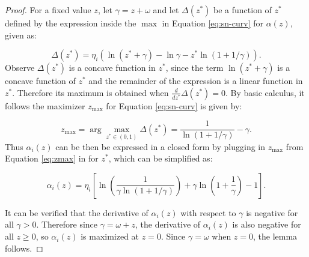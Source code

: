 \begin{proof} 

For a fixed value $z$, let $\gamma = z + \omega$ and let $\Delta(z^*)$ be a function of $z^*$ defined by the expression inside the $\max$ in Equation \eqref{eq:sn-curv} for $\alpha(z)$, given as:


\begin{equation*}
\Delta(z^*) = \eta_i\left(\ln(z^* + \gamma) - \ln \gamma - z^*\ln(1+1/\gamma)\right).
\end{equation*}
Observe $\Delta(z^*)$ is a concave function in $z^*$, since the term $\ln(z^* + \gamma)$ is a concave function of $z^*$
and the remainder of the expression is a linear function in $z^*$. 
Therefore its maximum is obtained when $\frac{d}{dz^*} \Delta(z^*) = 0.$ 
By basic calculus, it follows the maximizer $z_{\max}$ for Equation \eqref{eq:sn-curv}
is given by:

\begin{equation} 
\label{eq:zmax}
z_{\max} = \arg\max_{z^* \in (0, 1)} \Delta(z^*)  =  \frac{1}{\ln\left(1 + 1/\gamma \right)} - \gamma.
\end{equation}
Thus $\alpha_i(z)$ can be then be expressed in a
closed form by plugging in $z_{\max}$ from Equation \eqref{eq:zmax}
in for $z^*$, which can be simplified as:

\begin{equation*} 
\alpha_i(z) = \eta_i\left[\ln\left(\frac{1}{\gamma \ln(1+1/\gamma)}\right) + \gamma \ln\left(1+\frac{1}{\gamma}\right) - 1\right].
\end{equation*}

It can be verified that the derivative of $\alpha_i(z)$ with respect to $\gamma$ is negative for all $\gamma > 0$. Therefore since $\gamma = \omega + z$, 
the derivative of $\alpha_i(z)$ is also negative for all $z \geq 0$, so $\alpha_i(z)$ is maximized at $z = 0$. Since $\gamma = \omega$ when $z= 0$, the lemma follows.  
\end{proof}






